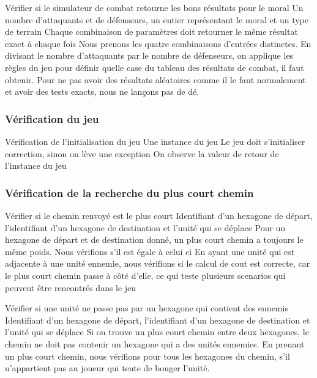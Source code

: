 \mytest
{Vérifier si le simulateur de combat retourne les bons résultats pour le moral}
{Un nombre d'attaquants et de défenseurs, un entier représentant le moral et un type de terrain}
{Chaque combinaison de paramètres doit retourner le même résultat exact à chaque fois}
{Nous prenons les quatre combinaisons d'entrées distinctes.
    En divisant le nombre d'attaquants par le nombre de défenseurs, on applique les règles du jeu pour définir
    quelle case du tableau des résultats de combat, il faut obtenir. Pour ne pas avoir des résultats aléatoires comme
    il le faut normalement et avoir des tests exacts, nous ne lançons pas de dé.}


\subsubsection{Vérification du jeu}

\mytest
{Vérification de l'initialisation du jeu}
{Une instance du jeu}
{Le jeu doit s'initialiser correction, sinon on lève une exception}
{On observe la valeur de retour de l'instance du jeu}

\mytest
{}
{}
{}
{}

\mytest
{}
{}
{}
{}

\mytest
{}
{}
{}
{}

\mytest
{}
{}
{}
{}

\subsubsection{Vérification de la recherche du plus court chemin}

\mytest
{Vérifier si le chemin renvoyé est le plus court}
{Identifiant d'un hexagone de départ, l'identifiant d'un hexagone de destination et l'unité qui se déplace}
{Pour un hexagone de départ et de destination donné, un plus court chemin a toujours le même poids. Nous vérifions
    s'il est égale à celui ci}
{En ayant une unité qui est adjacente à une unité ennemie, nous vérifions si le calcul de cout est correcte, car
    le plus court chemin passe à côté d'elle, ce qui teste plusieurs scenarios qui peuvent être rencontrés dans le jeu}

\mytest
{Vérifier si une unité ne passe pas par un hexagone qui contient des ennemis}
{Identifiant d'un hexagone de départ, l'identifiant d'un hexagone de destination et l'unité qui se déplace}
{Si on trouve un plus court chemin entre deux hexagones, le chemin ne doit pas contenir un hexagone qui a des
    unités ennemies.}
{En prenant un plus court chemin, nous vérifions pour tous les hexagones du chemin, s'il n'appartient pas
    au joueur qui tente de bouger l'unité.}

